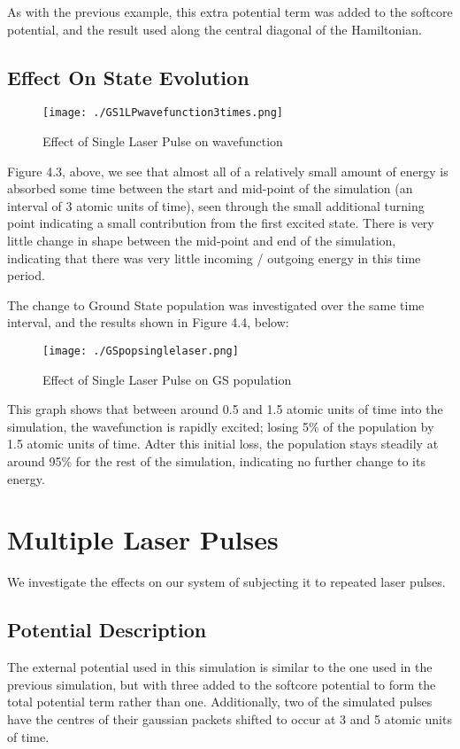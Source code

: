 As with the previous example, this extra potential term was added to the softcore potential, and the result used along the central diagonal of the Hamiltonian.

\subsection{Effect On State Evolution}

\begin{figure}[H]
          \texttt{[image: ./GS1LPwavefunction3times.png]}
          \centering
          \caption{Effect of Single Laser Pulse on wavefunction}
\end{figure}

Figure 4.3, above, we see that almost all of a relatively small amount of energy is absorbed some time between the start and mid-point of the simulation (an interval of 3 atomic units of time), seen through the small additional turning point indicating a small contribution from the first excited state. There is very little change in shape between the mid-point and end of the simulation, indicating that there was very little incoming / outgoing energy in this time period.

The change to Ground State population was investigated over the same time interval, and the results shown in Figure 4.4, below:
\begin{figure}[H]
          \texttt{[image: ./GSpopsinglelaser.png]}
          \centering
          \caption{Effect of Single Laser Pulse on GS population}
\end{figure}

This graph shows that between around 0.5 and 1.5 atomic units of time into the simulation, the wavefunction is rapidly excited; losing 5\% of the population by 1.5 atomic units of time. Adter this initial loss, the population stays steadily at around 95\% for the rest of the simulation, indicating no further change to its energy.

\section{Multiple Laser Pulses}

We investigate the effects on our system of subjecting it to repeated laser pulses. 

\subsection{Potential Description}
The external potential used in this simulation is similar to the one used in the previous simulation, but with three added to the softcore potential to form the total potential term rather than one. Additionally, two of the simulated pulses have the centres of their gaussian packets shifted to occur at 3 and 5 atomic units of time.

